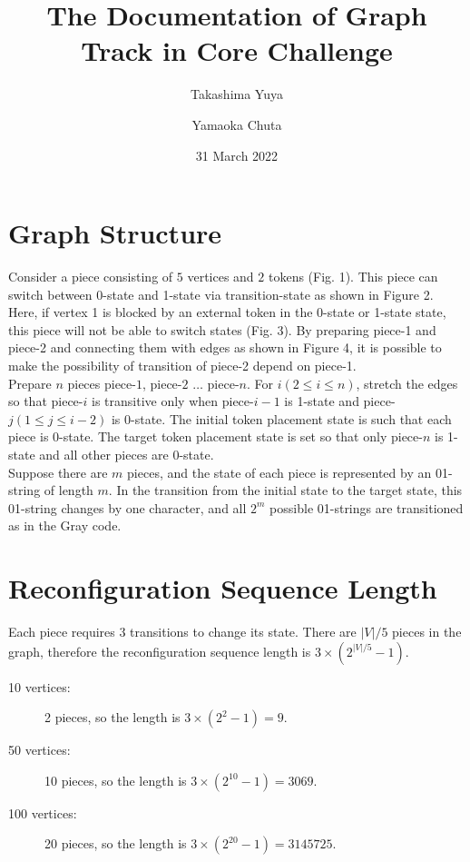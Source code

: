 \documentclass[dvipdfmx,autodetect-engine]{article}
\title{The Documentation of Graph Track in Core Challenge}
\author[1]{Takashima Yuya}
\author[1]{Yamaoka Chuta}
\affil[1]{Minato laboratory of Kyoto University}
\date{31 March 2022}
\begin{document}
\maketitle
\thispagestyle{empty}

\section{Graph Structure}
Consider a piece consisting of $5$ vertices and $2$ tokens (Fig. 1).
This piece can switch between 0-state and 1-state via transition-state as shown in Figure 2.\\
Here, if vertex 1 is blocked by an external token in the 0-state or 1-state state, this piece will not be able to switch states (Fig. 3). 
By preparing piece-1 and piece-2 and connecting them with edges as shown in Figure 4, it is possible to make the possibility of transition of piece-2 depend on piece-1.\\
Prepare $n$ pieces piece-$1$, piece-$2$ $\ldots$ piece-$n$. For $i (2 \le i \le n)$, stretch the edges so that piece-$i$ is transitive only when piece-$i-1$ is 1-state and piece-$j (1 \le j \le i-2)$ is 0-state.
The initial token placement state is such that each piece is 0-state.
The target token placement state is set so that only piece-$n$ is 1-state and all other pieces are 0-state.\\
Suppose there are $m$ pieces, and the state of each piece is represented by an 01-string of length $m$. In the transition from the initial state to the target state, this 01-string changes by one character, and all $2^m$ possible 01-strings are transitioned as in the Gray code.


\section{Reconfiguration Sequence Length}
Each piece requires $3$ transitions to change its state.
There are $|V|/5$ pieces in the graph, therefore the reconfiguration sequence length is $3 \times (2^{|V|/5} - 1)$.

\begin{description}
    \item[10 vertices:] 2 pieces, so the length is $3 \times (2^2 - 1) = 9$.
    \item[50 vertices:] 10 pieces, so the length is $3 \times (2^{10} - 1) = 3069$.
    \item[100 vertices:] 20 pieces, so the length is $3 \times (2^{20} - 1) = 3145725$.
\end{description}
\end{document}
